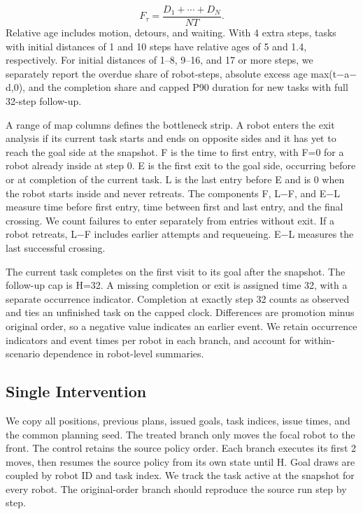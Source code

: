 \documentclass{article}
\begin{document}
\begin{equation}
F_\tau=\frac{D_1+\cdots+D_N}{NT}.
\end{equation}
Relative age includes motion, detours, and waiting. With 4 extra steps, tasks with initial distances of 1 and 10 steps have relative ages of 5 and 1.4, respectively. For initial distances of 1--8, 9--16, and 17 or more steps, we separately report the overdue share of robot-steps, absolute excess age max(t\ensuremath{-}a\ensuremath{-}d,0), and the completion share and capped P90 duration for new tasks with full 32-step follow-up.

A range of map columns defines the bottleneck strip. A robot enters the exit analysis if its current task starts and ends on opposite sides and it has yet to reach the goal side at the snapshot. F is the time to first entry, with F=0 for a robot already inside at step 0. E is the first exit to the goal side, occurring before or at completion of the current task. L is the last entry before E and is 0 when the robot starts inside and never retreats. The components F, L\ensuremath{-}F, and E\ensuremath{-}L measure time before first entry, time between first and last entry, and the final crossing. We count failures to enter separately from entries without exit. If a robot retreats, L\ensuremath{-}F includes earlier attempts and requeueing. E\ensuremath{-}L measures the last successful crossing.

The current task completes on the first visit to its goal after the snapshot. The follow-up cap is H=32. A missing completion or exit is assigned time 32, with a separate occurrence indicator. Completion at exactly step 32 counts as observed and ties an unfinished task on the capped clock. Differences are promotion minus original order, so a negative value indicates an earlier event. We retain occurrence indicators and event times per robot in each branch, and account for within-scenario dependence in robot-level summaries.

\subsection{Single Intervention}
We copy all positions, previous plans, issued goals, task indices, issue times, and the common planning seed. The treated branch only moves the focal robot to the front. The control retains the source policy order. Each branch executes its first 2 moves, then resumes the source policy from its own state until H. Goal draws are coupled by robot ID and task index. We track the task active at the snapshot for every robot. The original-order branch should reproduce the source run step by step.
\end{document}
